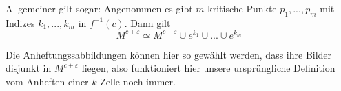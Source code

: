 \begin{corollary}
    Allgemeiner gilt sogar: Angenommen es gibt $m$ kritische Punkte 
    $p_1, ..., p_m$ mit Indizes $k_1, ..., k_m$ in $f^{-1}(c)$. Dann gilt
    \[ M^{c + \varepsilon} \simeq M^{c - \varepsilon} \cup e^{k_1} \cup ... \cup e^{k_m} \]

    Die Anheftungssabbildungen können hier so gewählt werden, dass ihre Bilder 
    disjunkt in $M^{c + \varepsilon}$ liegen, also funktioniert hier unsere 
    ursprüngliche Definition vom Anheften einer $k$-Zelle noch immer.
\end{corollary}
